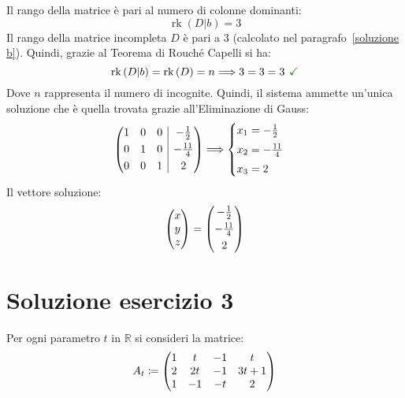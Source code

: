 \documentclass[a4paper]{article}
\makeatletter
\DeclareMathOperator{\rk}{rk}
\newenvironment{rowequmat}[1]{\left(\array{@{}#1@{}}}{\endarray\right)}
\makeatother
\begin{document}
	Il rango della matrice è pari al numero di colonne dominanti:
	\begin{equation*}
		\rk\left(D|b\right) = 3
	\end{equation*}
	Il rango della matrice incompleta $D$ è pari a $3$ (calcolato nel paragrafo~\ref{soluzione b}). Quindi, grazie al Teorema di Rouché Capelli si ha:
	\begin{equation*}
		\rk\left(D|b\right) = \rk\left(D\right) = n \Longrightarrow 3 = 3 = 3 \textcolor{Green4}{\textbf{ \checkmark}}
	\end{equation*}
	Dove $n$ rappresenta il numero di incognite. Quindi, il sistema ammette un'unica soluzione che è quella trovata grazie all'Eliminazione di Gauss:
	\begin{equation*}
		\begin{rowequmat}{ccc|c}
			1 & 0 & 0 & -\frac{1}{2} \\ [0.3em]
			0 & 1 & 0 & -\frac{11}{4} \\ [0.3em]
			0 & 0 & 1 & 2
		\end{rowequmat} \Longrightarrow
		\begin{cases}
			x_{1} = -\frac{1}{2} \vspace{0.3em} \\
			x_{2} = -\frac{11}{4} \vspace{0.3em} \\
			x_{3} = 2
		\end{cases}
	\end{equation*}
	Il vettore soluzione:
	\begin{equation*}
		\begin{rowequmat}{c}
			x \\
			y \\
			z
		\end{rowequmat}
		= \begin{rowequmat}{c}
			-\frac{1}{2} \\ [0.3em]
			-\frac{11}{4} \\ [0.3em]
			2
		\end{rowequmat}
	\end{equation*}\newpage

	\section{Soluzione esercizio 3}
	
	Per ogni parametro $t$ in $\mathbb{R}$ si consideri la matrice:
	\begin{equation*}
		A_{t} \coloneq \begin{rowequmat}{cccc}
			1 & t & -1 & t \\
			2 & 2t & -1 & 3t+1 \\
			1 & -1 & -t & 2
		\end{rowequmat}
	\end{equation*}
	
\end{document}
